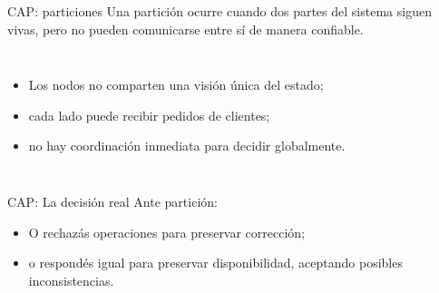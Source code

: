 \documentclass[institutional,screen,none]{ua-engineering-v6-beamer}
\begin{document}
\begin{frame}{CAP: particiones}
    Una partición ocurre cuando dos partes del sistema siguen vivas, pero no pueden comunicarse entre sí de manera confiable.

    \begin{columns}[T]
            \begin{itemize}
                \item Los nodos no comparten una visión única del estado;
                \item cada lado puede recibir pedidos de clientes;
                \item no hay coordinación inmediata para decidir globalmente.
            \end{itemize}

        \begin{center}
        \end{center}
    \end{columns}
\end{frame}

\begin{frame}{CAP: La decisión real}
    Ante partición:
    
    \begin{itemize}
        \item O rechazás operaciones para preservar corrección;
        \item o respondés igual para preservar disponibilidad, aceptando posibles inconsistencias.
    \end{itemize}
    
    \pause
    
    \begin{center}
    \end{center}
\end{frame}
\end{document}
